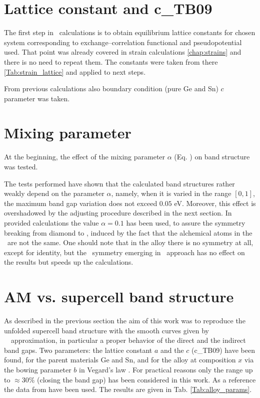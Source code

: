 \ornament

\section{Lattice constant and c\_TB09}

The first step in \abinitio\ calculations is to obtain equilibrium lattice constants for chosen system corresponding to exchange--correlation functional and pseudopotential used.
That point was already covered in strain calculations \ref{chap:strains} and there is no need to repeat them.
The constants were taken from there \ref{Tab:strain_lattice} and applied to next steps.

From previous calculations also boundary condition (pure Ge and Sn) $c$ parameter was taken.

\ornament

\section{Mixing parameter}

At the beginning, the effect  of the mixing parameter $\alpha$ (Eq. ) on band structure was tested.

The tests performed have shown that the calculated band structures rather weakly depend on the parameter $\alpha$, namely, when it is varied in the range $[0,1]$, the maximum band gap variation does not exceed $0.05$ eV.
Moreover, this effect is overshadowed by the adjusting procedure described in the next section.
In provided calculations the value $\alpha=0.1$ has been used, to assure the symmetry breaking from diamond to \BZ, induced by the fact that the alchemical atoms in the \prim\ are not the same. One should note that in the alloy there is no symmetry at all, except for identity, but the \BZ\ symmetry emerging in \AM\ approach has no effect on the results but speeds up the calculations.   

\ornament

\section{AM vs. supercell band structure}

As described in the previous section the aim of this work was to reproduce the unfolded supercell band structure with the smooth curves given by \DFT\ \AM\ approximation, in particular a proper behavior of the direct and the indirect band gaps.
Two parameters: the lattice constant $a$ and the $c$ (c\_TB09) have been found, for the parent materials Ge and Sn, and for the alloy at composition $x$ via the bowing parameter $b$ in Vegard's law .
For practical reasons only the range up to $\approx 30\%$ (closing the band gap) has been considered in this work.
As a reference the data from \cite{Polak_2017} have been used.
The results are given in Tab. \ref{Tab:alloy_params}. 

